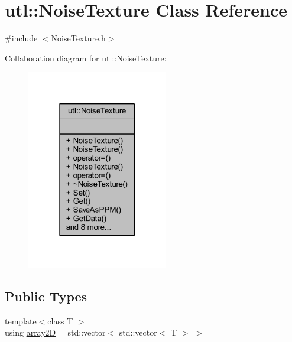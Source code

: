 \hypertarget{classutl_1_1_noise_texture}{}\section{utl\+:\+:Noise\+Texture Class Reference}
\label{classutl_1_1_noise_texture}


{\ttfamily \#include $<$Noise\+Texture.\+h$>$}



Collaboration diagram for utl\+:\+:Noise\+Texture\+:
\nopagebreak
\begin{figure}[H]
\begin{center}
\leavevmode
\includegraphics[width=175pt]{classutl_1_1_noise_texture__coll__graph}
\end{center}
\end{figure}
\subsection*{Public Types}
\begin{DoxyCompactItemize}
\item 
{\footnotesize template$<$class T $>$ }\\using \mbox{\hyperlink{classutl_1_1_noise_texture_a68a400f15c53ed50fe2c9bc8f6f1a9c9}{array2D}} = std\+::vector$<$ std\+::vector$<$ T $>$ $>$
\end{DoxyCompactItemize}
